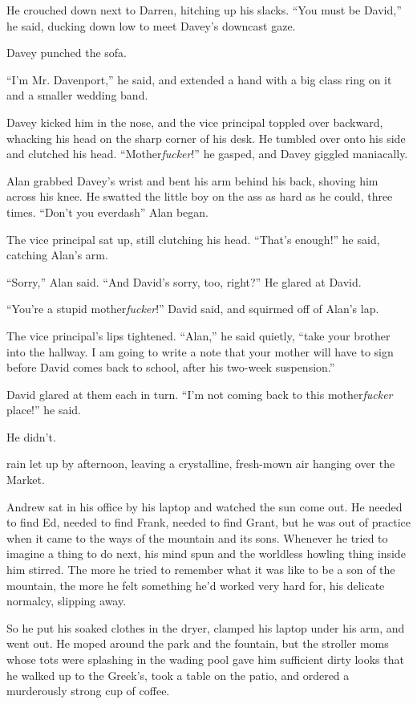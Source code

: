 He crouched down next to Darren, hitching up his slacks.  ``You must
be David,'' he said, ducking down low to meet Davey's downcast gaze.

Davey punched the sofa.

``I'm Mr.  Davenport,'' he said, and extended a hand with a big class
ring on it and a smaller wedding band.

Davey kicked him in the nose, and the vice principal toppled over
backward, whacking his head on the sharp corner of his desk.  He
tumbled over onto his side and clutched his head. 
``Mother\textit{fucker}!'' he gasped, and Davey giggled maniacally.

Alan grabbed Davey's wrist and bent his arm behind his back, shoving
him across his knee.  He swatted the little boy on the ass as hard as
he could, three times.  ``Don't you everdash{}'' Alan began.

The vice principal sat up, still clutching his head.  ``That's
enough!'' he said, catching Alan's arm.

``Sorry,'' Alan said.  ``And David's sorry, too, right?'' He glared at
David.

``You're a stupid mother\textit{fucker}!'' David said, and squirmed
off of Alan's lap.

The vice principal's lips tightened.  ``Alan,'' he said quietly,
``take your brother into the hallway.  I am going to write a note that
your mother will have to sign before David comes back to school, after
his two-week suspension.''

David glared at them each in turn.  ``I'm not coming back to this
mother\textit{fucker} place!'' he said.

He didn't.

 rain let up by afternoon, leaving a crystalline, fresh-mown air
hanging over the Market.

Andrew sat in his office by his laptop and watched the sun come out. 
He needed to find Ed, needed to find Frank, needed to find Grant, but
he was out of practice when it came to the ways of the mountain and
its sons.  Whenever he tried to imagine a thing to do next, his mind
spun and the worldless howling thing inside him stirred.  The more he
tried to remember what it was like to be a son of the mountain, the
more he felt something he'd worked very hard for, his delicate
normalcy, slipping away.

So he put his soaked clothes in the dryer, clamped his laptop under
his arm, and went out.  He moped around the park and the fountain, but
the stroller moms whose tots were splashing in the wading pool gave
him sufficient dirty looks that he walked up to the Greek's, took a
table on the patio, and ordered a murderously strong cup of coffee.

